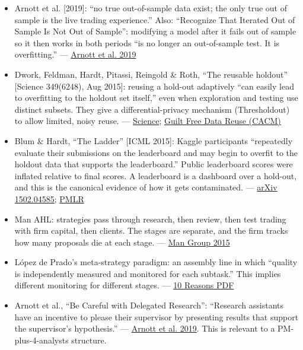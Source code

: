\documentclass{article}
\begin{document}
\begin{itemize}

\item Arnott et al. [2019]: ``no true out-of-sample data exist; the only true out of sample is the live trading experience.'' Also: ``Recognize That Iterated Out of Sample Is Not Out of Sample'': modifying a model after it fails out of sample so it then works in both periods ``is no longer an out-of-sample test. It is overfitting.'' --- \href{https://people.duke.edu/~charvey/Research/Published_Papers/P138_A_backtesting_protocol.pdf}{Arnott et al. 2019}

\item Dwork, Feldman, Hardt, Pitassi, Reingold \& Roth, ``The reusable holdout'' [Science 349(6248), Aug 2015]: reusing a hold-out adaptively ``can easily lead to overfitting to the holdout set itself,'' even when exploration and testing use distinct subsets. They give a differential-privacy mechanism (Thresholdout) to allow limited, noisy reuse. --- \href{https://www.science.org/doi/10.1126/science.aaa9375}{Science}; \href{https://www.cs.toronto.edu/~toni/Papers/holdout-cacm.pdf}{Guilt Free Data Reuse (CACM)}

\item Blum \& Hardt, ``The Ladder'' [ICML 2015]: Kaggle participants ``repeatedly evaluate their submissions on the leaderboard and may begin to overfit to the holdout data that supports the leaderboard.'' Public leaderboard scores were inflated relative to final scores. A leaderboard is a dashboard over a hold-out, and this is the canonical evidence of how it gets contaminated. --- \href{https://arxiv.org/pdf/1502.04585}{arXiv 1502.04585}; \href{https://proceedings.mlr.press/v37/blum15.pdf}{PMLR}

\item Man AHL: strategies pass through research, then review, then test trading with firm capital, then clients. The stages are separate, and the firm tracks how many proposals die at each stage. --- \href{https://www.man.com/insights/overfitting-and-its-impact-on-the-investor}{Man Group 2015}

\item López de Prado's meta-strategy paradigm: an assembly line in which ``quality is independently measured and monitored for each subtask.'' This implies different monitoring for different stages. --- \href{https://www.smallake.kr/wp-content/uploads/2018/07/SSRN-id3104816.pdf}{10 Reasons PDF}

\item Arnott et al., ``Be Careful with Delegated Research'': ``Research assistants have an incentive to please their supervisor by presenting results that support the supervisor's hypothesis.'' --- \href{https://people.duke.edu/~charvey/Research/Published_Papers/P138_A_backtesting_protocol.pdf}{Arnott et al. 2019}. This is relevant to a PM-plus-4-analysts structure.

\end{itemize}
\end{document}
